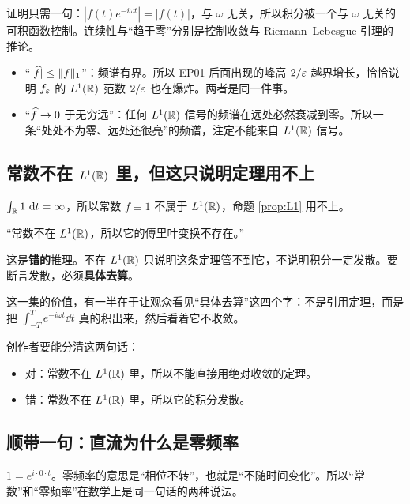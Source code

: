 证明只需一句：$|f(t)e^{-i\omega t}|=|f(t)|$，与 $\omega$ 无关，所以积分被一个与 $\omega$ 无关的可积函数控制。连续性与“趋于零”分别是控制收敛与 Riemann--Lebesgue 引理的推论。

\begin{notebox}[这两条性质在画面上的意义]
\begin{itemize}[leftmargin=1.4em,itemsep=0.2em]
\item “$|\widehat{f}|\le\|f\|_1$”：频谱有界。所以 EP01 后面出现的峰高 $2/\varepsilon$ 越界增长，恰恰说明 $f_\varepsilon$ 的 $L^1(\mathbb{R})$ 范数 $2/\varepsilon$ 也在爆炸。两者是同一件事。
\item “$\widehat{f}\to0$ 于无穷远”：任何 $L^1(\mathbb{R})$ 信号的频谱在远处必然衰减到零。所以一条“处处不为零、远处还很亮”的频谱，注定不能来自 $L^1(\mathbb{R})$ 信号。
\end{itemize}
\end{notebox}

\subsection{常数不在 $L^1(\mathbb{R})$ 里，但这只说明定理用不上}

$\int_{\mathbb{R}}1\,\mathop{}\!\mathrm{d} t=\infty$，所以常数 $f\equiv1$ 不属于 $L^1(\mathbb{R})$，命题 \ref{prop:L1} 用不上。

\begin{warnbox}[一个非常容易被滥用的推理]
“常数不在 $L^1(\mathbb{R})$，所以它的傅里叶变换不存在。”

这是\textbf{错的}推理。不在 $L^1(\mathbb{R})$ 只说明这条定理管不到它，不说明积分一定发散。要断言发散，必须\textbf{具体去算}。

这一集的价值，有一半在于让观众看见“具体去算”这四个字：不是引用定理，而是把 $\int_{-T}^{T}e^{-i\omega t}\dd t$ 真的积出来，然后看着它不收敛。

创作者要能分清这两句话：
\begin{itemize}[leftmargin=1.4em,itemsep=0.2em]
\item 对：常数不在 $L^1(\mathbb{R})$ 里，所以不能直接用绝对收敛的定理。
\item 错：常数不在 $L^1(\mathbb{R})$ 里，所以它的积分发散。
\end{itemize}
\end{warnbox}

\subsection{顺带一句：直流为什么是零频率}

$1=e^{i\cdot0\cdot t}$。零频率的意思是“相位不转”，也就是“不随时间变化”。所以“常数”和“零频率”在数学上是同一句话的两种说法。

